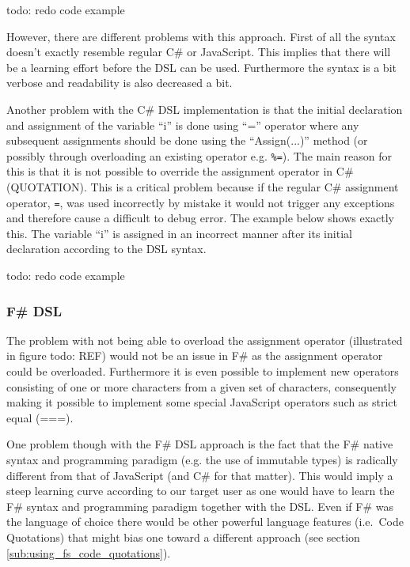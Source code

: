 			todo: redo code example

			However, there are different problems with this approach. First of all the syntax doesn't exactly resemble regular C\# or JavaScript. This implies that there will be a learning effort before the DSL can be used. Furthermore the syntax is a bit verbose and readability is also decreased a bit.

			Another problem with the C\# DSL implementation is that the initial declaration and assignment of the variable ``i'' is done using ``='' operator where any subsequent assignments should be done using the ``Assign(...)'' method (or possibly through overloading an existing operator e.g. \texttt{\%=}). The main reason for this is that it is not possible to override the assignment operator in C\# (QUOTATION). This is a critical problem because if the regular C\# assignment operator, \texttt{=}, was used incorrectly by mistake it would not trigger any exceptions and therefore cause a difficult to debug error.  The example below shows exactly this. The variable ``i'' is assigned in an incorrect manner after its initial declaration according to the DSL syntax.

			todo: redo code example
		

		\subsubsection{F\# DSL} %
		\label{sub:fs_dsl}
			The problem with not being able to overload the assignment operator (illustrated in figure todo: REF) would not be an issue in F\# as the assignment operator could be overloaded. Furthermore it is even possible to implement new operators consisting of one or more characters from a given set of characters, consequently making it possible to implement some special JavaScript operators such as strict equal (===).

			One problem though with the F\# DSL approach is the fact that the F\# native syntax and programming paradigm (e.g. the use of immutable types) is radically different from that of JavaScript (and C\# for that matter). This would imply a steep learning curve according to our target user as one would have to learn the F\# syntax and programming paradigm together with the DSL. Even if F\# was the language of choice there would be other powerful language features (i.e.\ Code Quotations) that might bias one toward a different approach (see section \ref{sub:using_fs_code_quotations}).

